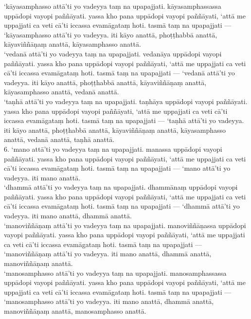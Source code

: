 \documentclass[11pt]{article}
\begin{document}
‘kāyasamphasso attā’ti yo vadeyya taṃ na upapajjati. kāyasamphassassa uppādopi vayopi paññāyati. yassa kho pana uppādopi vayopi paññāyati, ‘attā me uppajjati ca veti cā’ti iccassa evamāgataṃ hoti. tasmā taṃ na upapajjati — ‘kāyasamphasso attā’ti yo vadeyya. iti kāyo anattā, phoṭṭhabbā anattā, kāyaviññāṇaṃ anattā, kāyasamphasso anattā.\\

‘vedanā attā’ti yo vadeyya taṃ na upapajjati. vedanāya uppādopi vayopi paññāyati. yassa kho pana uppādopi vayopi paññāyati, ‘attā me uppajjati ca veti cā’ti iccassa evamāgataṃ hoti. tasmā taṃ na upapajjati — ‘vedanā attā’ti yo vadeyya. iti kāyo anattā, phoṭṭhabbā anattā, kāyaviññāṇaṃ anattā, kāyasamphasso anattā, vedanā anattā.\\

‘taṇhā attā’ti yo vadeyya taṃ na upapajjati. taṇhāya uppādopi vayopi paññāyati. yassa kho pana uppādopi vayopi paññāyati, ‘attā me uppajjati ca veti cā’ti iccassa evamāgataṃ hoti. tasmā taṃ na upapajjati — ‘taṇhā attā’ti yo vadeyya. iti kāyo anattā, phoṭṭhabbā anattā, kāyaviññāṇaṃ anattā, kāyasamphasso anattā, vedanā anattā, taṇhā anattā.\\

6. ‘mano attā’ti yo vadeyya taṃ na upapajjati. manassa uppādopi vayopi paññāyati. yassa kho pana uppādopi vayopi paññāyati, ‘attā me uppajjati ca veti cā’ti iccassa evamāgataṃ hoti. tasmā taṃ na upapajjati — ‘mano attā’ti yo vadeyya. iti mano anattā.\\

‘dhammā attā’ti yo vadeyya taṃ na upapajjati. dhammānaṃ uppādopi vayopi paññāyati. yassa kho pana uppādopi vayopi paññāyati, ‘attā me uppajjati ca veti cā’ti iccassa evamāgataṃ hoti. tasmā taṃ na upapajjati — ‘dhammā attā’ti yo vadeyya. iti mano anattā, dhammā anattā.\\

‘manoviññāṇaṃ attā’ti yo vadeyya taṃ na upapajjati. manoviññāṇassa uppādopi vayopi paññāyati. yassa kho pana uppādopi vayopi paññāyati, ‘attā me uppajjati ca veti cā’ti iccassa evamāgataṃ hoti. tasmā taṃ na upapajjati — ‘manoviññāṇaṃ attā’ti yo vadeyya. iti mano anattā, dhammā anattā, manoviññāṇaṃ anattā.\\

‘manosamphasso attā’ti yo vadeyya taṃ na upapajjati. manosamphassassa uppādopi vayopi paññāyati. yassa kho pana uppādopi vayopi paññāyati, ‘attā me uppajjati ca veti cā’ti iccassa evamāgataṃ hoti. tasmā taṃ na upapajjati — ‘manosamphasso attā’ti yo vadeyya. iti mano anattā, dhammā anattā, manoviññāṇaṃ anattā, manosamphasso anattā.\\
\end{document}
